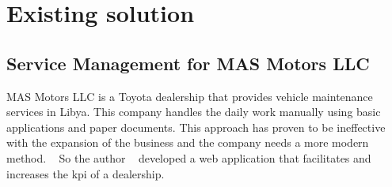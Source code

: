 




\section{Existing solution}


\subsection{Service Management for MAS Motors LLC}
MAS Motors LLC is a Toyota dealership that provides vehicle maintenance services in Libya.
This company handles the daily work manually using basic applications and paper documents.
This approach has proven to be ineffective with the expansion of the business and the company needs a more modern method. ~\cite{MAS_MOTORS}
So the author ~\citet{MAS_MOTORS} developed a web application that facilitates and increases the \acs{kpi} of a dealership.

